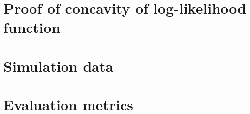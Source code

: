 
\chapter{Proof of concavity of log-likelihood function}

\lipsum[77]

\chapter{Simulation data}

\lipsum[82]

\chapter{Evaluation metrics}

\lipsum[32]